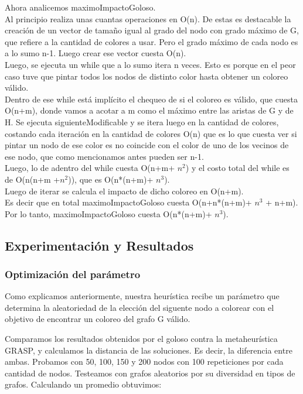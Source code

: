 \indent Ahora analicemos maximoImpactoGoloso.\\
\indent Al principio realiza unas cuantas operaciones en O(n). De estas es destacable la creación de un vector de tamaño igual al grado del nodo con grado máximo de G, que refiere a la cantidad de colores a usar. Pero el grado máximo de cada nodo es a lo sumo n-1. Luego crear ese vector cuesta O(n).\\
\indent Luego, se ejecuta un while que a lo sumo itera n veces. Esto es porque en el peor caso tuve que pintar todos los nodos de distinto color hasta obtener un coloreo válido.\\
\indent Dentro de ese while está implícito el chequeo de si el coloreo es válido, que cuesta O(n+m), donde vamos a acotar a m como el máximo entre las aristas de G y de H. Se ejecuta siguienteModificable y se itera luego en la cantidad de colores, costando cada iteración en la cantidad de colores O(n) que es lo que cuesta ver si pintar un nodo de ese color es no coincide con el color de uno de los vecinos de ese nodo, que como mencionamos antes pueden ser n-1.\\
\indent Luego, lo de adentro del while cuesta O(n+m+ $n^{2}$) y el costo total del while es de O(n(n+m +$n^{2}$)), que es O(n*(n+m)+ $n^{3}$).\\
\indent Luego de iterar se calcula el impacto de dicho coloreo en O(n+m).\\
\indent Es decir que en total maximoImpactoGoloso cuesta O(n+n*(n+m)+ $n^{3}$ + n+m).\\
\indent Por lo tanto, maximoImpactoGoloso cuesta O(n*(n+m)+ $n^{3}$).\\
 
\subsection{Experimentación y Resultados}


\subsubsection{Optimización del parámetro}

\quad Como explicamos anteriormente, nuestra heurística recibe un parámetro que determina la aleatoriedad de la elección del siguente nodo a colorear con el objetivo de encontrar un coloreo del grafo G válido.

\quad Comparamos los resultados obtenidos por el goloso contra la metaheurística GRASP, y calculamos la distancia de las soluciones. Es decir, la diferencia entre ambas. Probamos con 50, 100, 150 y 200 nodos con 100 repeticiones por cada cantidad de nodos. Testeamos con grafos aleatorios por su diversidad en tipos de grafos. Calculando un promedio obtuvimos:

